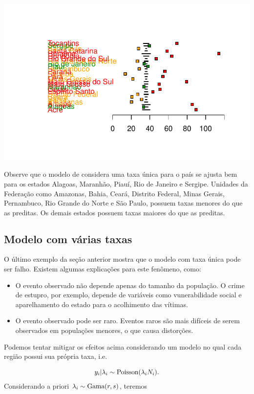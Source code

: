 \documentclass[
  letterpaper,
  DIV=11,
  numbers=noendperiod]{scrreprt}
\theoremstyle{definition}
\theoremstyle{plain}
\theoremstyle{definition}
\theoremstyle{remark}
\begin{document}
\includegraphics{poisson_files/figure-pdf/unnamed-chunk-5-1.pdf}

Observe que o modelo de considera uma taxa única para o país se ajusta
bem para os estados Alagoas, Maranhão, Piauí, Rio de Janeiro e Sergipe.
Unidades da Federação como Amazonas, Bahia, Ceará, Distrito Federal,
Minas Gerais, Pernambuco, Rio Grande do Norte e São Paulo, possuem taxas
menores do que as preditas. Os demais estados possuem taxas maiores do
que as preditas.

\subsection{Modelo com várias taxas}\label{modelo-com-vuxe1rias-taxas}

O último exemplo da seção anterior mostra que o modelo com taxa única
pode ser falho. Existem algumas explicações para este fenômeno, como:

\begin{itemize}
\item
  O evento observado não depende apenas do tamanho da população. O crime
  de estupro, por exemplo, depende de variáveis como vunerabilidade
  social e aparelhamento do estado para o acolhimento das vítimas.
\item
  O evento observado pode ser raro. Eventos raros são mais difíceis de
  serem observados em populações menores, o que causa distorções.
\end{itemize}

Podemos tentar mitigar os efeitos acima considerando um modelo no qual
cada região possui sua própria taxa, i.e.

\[y_i|\lambda_i\sim\hbox{Poisson}(\lambda_i N_i).\] Considerando a
priori \(\lambda_i\sim\hbox{Gama}(r,s)\), teremos
\end{document}
